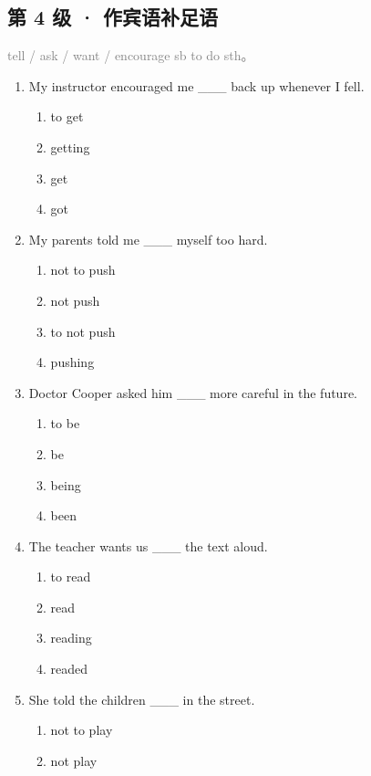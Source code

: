 \documentclass[11pt,a4paper]{ctexart}
\begin{document}
\subsection*{第 4 级 · 作宾语补足语}
\noindent\textcolor{gray}{tell / ask / want / encourage sb to do sth。}\par\smallskip
\begin{enumerate}[leftmargin=*,itemsep=4pt]
\item My instructor encouraged me \_\_\_ back up whenever I fell.
\begin{enumerate}[label=\Alph*.,leftmargin=2em,itemsep=1pt,topsep=2pt]
\item to get
\item getting
\item get
\item got
\end{enumerate}
\item My parents told me \_\_\_ myself too hard.
\begin{enumerate}[label=\Alph*.,leftmargin=2em,itemsep=1pt,topsep=2pt]
\item not to push
\item not push
\item to not push
\item pushing
\end{enumerate}
\item Doctor Cooper asked him \_\_\_ more careful in the future.
\begin{enumerate}[label=\Alph*.,leftmargin=2em,itemsep=1pt,topsep=2pt]
\item to be
\item be
\item being
\item been
\end{enumerate}
\item The teacher wants us \_\_\_ the text aloud.
\begin{enumerate}[label=\Alph*.,leftmargin=2em,itemsep=1pt,topsep=2pt]
\item to read
\item read
\item reading
\item readed
\end{enumerate}
\item She told the children \_\_\_ in the street.
\begin{enumerate}[label=\Alph*.,leftmargin=2em,itemsep=1pt,topsep=2pt]
\item not to play
\item not play

\end{enumerate}
\end{enumerate}
\end{document}
